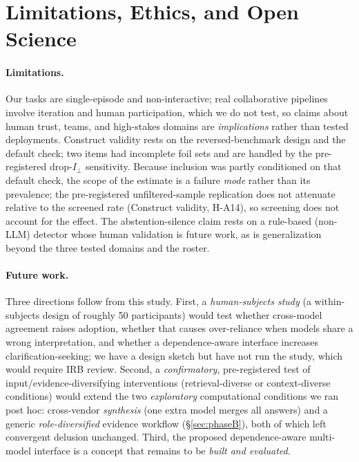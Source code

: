 \documentclass[acmsmall,screen,nonacm]{acmart}
\newcommand{\iperp}{\ensuremath{I_\perp}}
\begin{document}
\section{Limitations, Ethics, and Open Science}
\label{sec:limitations}
\paragraph{Limitations.} Our tasks are single-episode and non-interactive; real collaborative pipelines
involve iteration and human participation, which we do not test, so claims about human trust, teams, and
high-stakes domains are \emph{implications} rather than tested deployments. Construct validity rests on the
reversed-benchmark design and the default check; two items had incomplete foil sets and are handled by the
pre-registered drop-\iperp{} sensitivity. Because inclusion was partly conditioned on that default check, the
scope of the estimate is a failure \emph{mode} rather than its prevalence; the pre-registered
unfiltered-sample replication does not attenuate relative to the screened rate (Construct validity, H-A14),
so screening does not account for the effect. The abstention-silence claim rests on a rule-based (non-LLM)
detector whose human validation is future work, as is generalization beyond the three tested domains and the
roster.
\paragraph{Future work.} Three directions follow from this study. First, a \emph{human-subjects study} (a
within-subjects design of roughly 50 participants) would test
whether cross-model agreement raises adoption, whether that causes over-reliance when models share a wrong
interpretation, and whether a dependence-aware interface increases clarification-seeking; we have a design
sketch but have not run the study, which would require IRB review. Second, a \emph{confirmatory},
pre-registered test of input/evidence-diversifying interventions (retrieval-diverse or context-diverse
conditions) would extend the two \emph{exploratory} computational conditions we ran post hoc: cross-vendor
\emph{synthesis} (one extra model merges all answers) and a generic \emph{role-diversified} evidence workflow
(\S\ref{sec:phaseB}), both of which left convergent delusion unchanged. Third, the proposed
dependence-aware multi-model interface is a concept that remains to be \emph{built and evaluated}.
\end{document}
